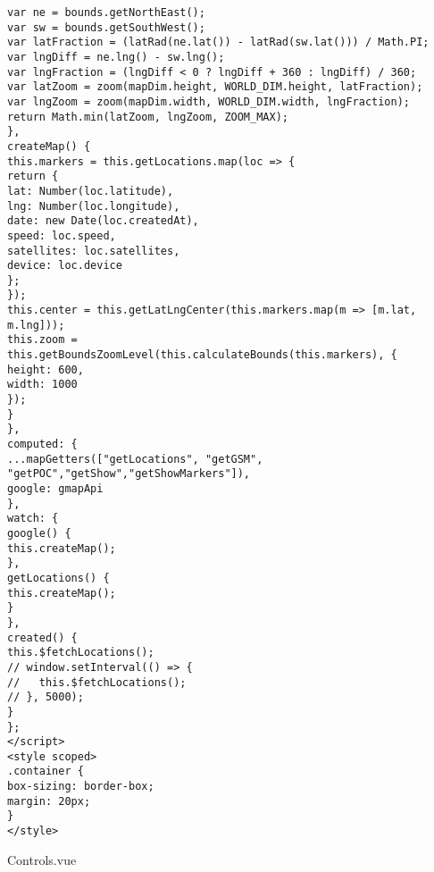 \begin{verbatim}
var ne = bounds.getNorthEast();
var sw = bounds.getSouthWest();
var latFraction = (latRad(ne.lat()) - latRad(sw.lat())) / Math.PI;
var lngDiff = ne.lng() - sw.lng();
var lngFraction = (lngDiff < 0 ? lngDiff + 360 : lngDiff) / 360;
var latZoom = zoom(mapDim.height, WORLD_DIM.height, latFraction);
var lngZoom = zoom(mapDim.width, WORLD_DIM.width, lngFraction);
return Math.min(latZoom, lngZoom, ZOOM_MAX);
},
createMap() {
this.markers = this.getLocations.map(loc => {
return {
lat: Number(loc.latitude),
lng: Number(loc.longitude),
date: new Date(loc.createdAt),
speed: loc.speed,
satellites: loc.satellites,
device: loc.device
};
});
this.center = this.getLatLngCenter(this.markers.map(m => [m.lat, m.lng]));
this.zoom = this.getBoundsZoomLevel(this.calculateBounds(this.markers), {
height: 600,
width: 1000
});
}
},
computed: {
...mapGetters(["getLocations", "getGSM", "getPOC","getShow","getShowMarkers"]),
google: gmapApi
},
watch: {
google() {
this.createMap();
},
getLocations() {
this.createMap();
}
},
created() {
this.$fetchLocations();
// window.setInterval(() => {
//   this.$fetchLocations();
// }, 5000);
}
};
</script>
<style scoped>
.container {
box-sizing: border-box;
margin: 20px;
}
</style>
\end{verbatim}
Controls.vue
